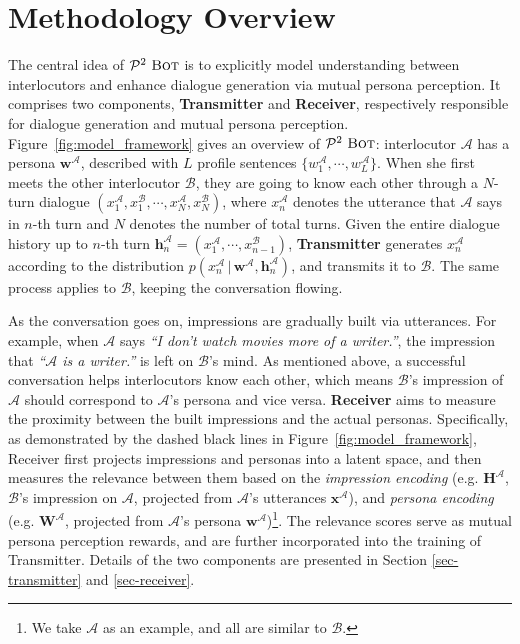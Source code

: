 \documentclass[11pt,a4paper]{article}
\begin{document}
\section{Methodology Overview}

The central idea of $\mathcal{P}^2~\textsc{Bot}$ is to explicitly model understanding between interlocutors and enhance dialogue generation via mutual persona perception. It comprises two components, \textbf{Transmitter} and \textbf{Receiver}, respectively responsible for dialogue generation and mutual persona perception. Figure~\ref{fig:model_framework} gives an overview of $\mathcal{P}^2~\textsc{Bot}$: interlocutor $\mathcal{A}$ has a persona $\mathbf{w}^{\mathcal{A}}$, described with $L$ profile sentences $\{w^{\mathcal{A}}_{1}, \cdots, w^{\mathcal{A}}_{L}\}$. When she first meets the other interlocutor $\mathcal{B}$, they are going to know each other through a $N$-turn dialogue $(x^{\mathcal{A}}_{1}, x^{\mathcal{B}}_{1}, \cdots, x^{\mathcal{A}}_{N}, x^{\mathcal{B}}_{N})$, where $x^{\mathcal{A}}_{n}$ denotes the utterance that $\mathcal{A}$ says in $n$-th turn and $N$ denotes the number of total turns. Given the entire dialogue history up to $n$-th turn $\mathbf{h}^{\mathcal{A}}_n = (x^{\mathcal{A}}_{1}, \cdots, x^{\mathcal{B}}_{n-1})$, \textbf{Transmitter} generates $x^\mathcal{A}_{n}$ according to the distribution $p(x^\mathcal{A}_{n}\,|\,\mathbf{w}^\mathcal{A},\mathbf{h}^{\mathcal{A}}_n)$, and transmits it to $\mathcal{B}$. The same process applies to $\mathcal{B}$, keeping the conversation flowing.


As the conversation goes on, impressions are gradually built via utterances. 
For example, when $\mathcal{A}$ says \textit{``I don't watch movies more of a writer.''}, the impression that \textit{``$\mathcal{A}$ is a writer.''} is left on $\mathcal{B}$'s mind. 
As mentioned above, a successful conversation helps interlocutors know each other, 
which means $\mathcal{B}$'s impression of $\mathcal{A}$ should correspond to $\mathcal{A}$'s persona and vice versa. \textbf{Receiver} aims to measure the proximity between the built impressions and the actual personas. Specifically, as demonstrated by the dashed black lines in Figure~\ref{fig:model_framework}, Receiver first projects impressions and personas into a latent space, and then measures the relevance between them based on the \emph{impression encoding} (e.g. $\mathbf{H}^\mathcal{A}$, $\mathcal{B}$'s impression on $\mathcal{A}$, projected from $\mathcal{A}$'s utterances $\mathbf{x}^\mathcal{A}$), and \emph{persona encoding} (e.g. $\mathbf{W}^\mathcal{A}$, projected from $\mathcal{A}$'s persona $\mathbf{w}^\mathcal{A}$)\footnote{We take $\mathcal{A}$ as an example, and all are similar to $\mathcal{B}$.}. The relevance scores serve as mutual persona perception rewards, and are further incorporated into the training of Transmitter. Details of the two components are presented in Section \ref{sec-transmitter} and \ref{sec-receiver}. 
\end{document}
